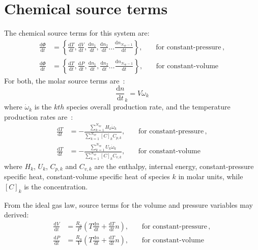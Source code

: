 \documentclass[12pt]{article}
\newcommand{\ns}{\ensuremath{{N_{sp}}}}
\newcommand{\conp}{constant-pressure}
\newcommand{\conv}{constant-volume}
\newcommand{\dconp}{\ensuremath{,\qquad\text{for \conp}}}
\newcommand{\dconv}{\ensuremath{,\qquad\text{for \conv}}}
\begin{document}
\section{Chemical source terms}
The chemical source terms for this system are:
\begin{subequations}
\begin{align}
\frac{\text{d} \Phi }{\text{d} t } &= \left\{\frac{\text{d} T }{\text{d} t },\frac{\text{d} V }{\text{d} t },\frac{\text{d} n_1}{\text{d} t },\frac{\text{d} n_2 }{\text{d} t }\ldots \frac{\text{d} n_{\ns - 1} }{\text{d} t }\right\}\dconp, \\
\frac{\text{d} \Phi }{\text{d} t } &= \left\{\frac{\text{d} T }{\text{d} t },\frac{\text{d} P }{\text{d} t },\frac{\text{d} n_1}{\text{d} t },\frac{\text{d} n_2 }{\text{d} t }\ldots \frac{\text{d} n_{\ns - 1} }{\text{d} t }\right\}\dconv 
\end{align}
\end{subequations}
For both, the molar source terms are~\cite{TurnsStephenR2012Aitc}:
\begin{equation}
\frac{\text{d} n }{\text{d} t }_{k} = V \dot{\omega}_{k}
\label{source:spec}
\end{equation}
where $\dot{\omega}_k$ is the $kth$ species overall production rate, and the temperature production rates are~\cite{TurnsStephenR2012Aitc}:
\begin{subequations}
\label{source:temperature_incomplete}
\begin{align}
\frac{\text{d} T }{\text{d} t } &= - \frac{\sum_{k=1}^{\ns} H_{k} \dot{\omega}_{k}}{\sum_{k=1}^{\ns} [C]_{k} {C_{p, k}}}\dconp, \\
\frac{\text{d} T }{\text{d} t } &= - \frac{\sum_{k=1}^{\ns} U_{k} \dot{\omega}_{k}}{\sum_{k=1}^{\ns} [C]_{k} {C_{v, k}}}\dconv
\end{align}
\end{subequations}
where $H_k$, $U_k$, $C_{p,k}$ and $C_{v, k}$ are the enthalpy, internal energy, constant-pressure specific heat, constant-volume specific heat of species $k$ in molar units, while $[C]_{k}$ is the concentration.

From the ideal gas law, source terms for the volume and pressure variables may derived:
\begin{subequations}
\label{source:param_incomplete}
\begin{align}
\frac{\text{d} V }{\text{d} t } &= \frac{R_u}{P} \left(T \frac{\text{d} n }{\text{d} t } + \frac{\text{d} T }{\text{d} t } n\right)\dconp, \\
\frac{\text{d} P }{\text{d} t } &= \frac{R_u}{V} \left(T \frac{\text{d} n }{\text{d} t } + \frac{\text{d} T }{\text{d} t } n\right)\dconv
\end{align}
\end{subequations}
\end{document}
